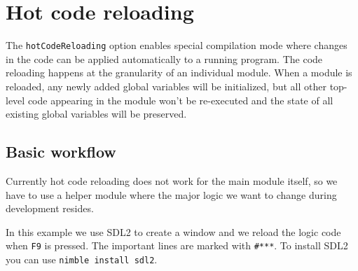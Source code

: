 \hypertarget{hot-code-reloading}{%
\section{Hot code reloading}\label{hot-code-reloading}}

The \texttt{hotCodeReloading} option enables special compilation mode
where changes in the code can be applied automatically to a running
program. The code reloading happens at the granularity of an individual
module. When a module is reloaded, any newly added global variables will
be initialized, but all other top-level code appearing in the module
won't be re-executed and the state of all existing global variables will
be preserved.

\hypertarget{basic-workflow}{%
\subsection{Basic workflow}\label{basic-workflow}}

Currently hot code reloading does not work for the main module itself,
so we have to use a helper module where the major logic we want to
change during development resides.

In this example we use SDL2 to create a window and we reload the logic
code when \texttt{F9} is pressed. The important lines are marked with
\texttt{\#***}. To install SDL2 you can use
\texttt{nimble\ install\ sdl2}.

